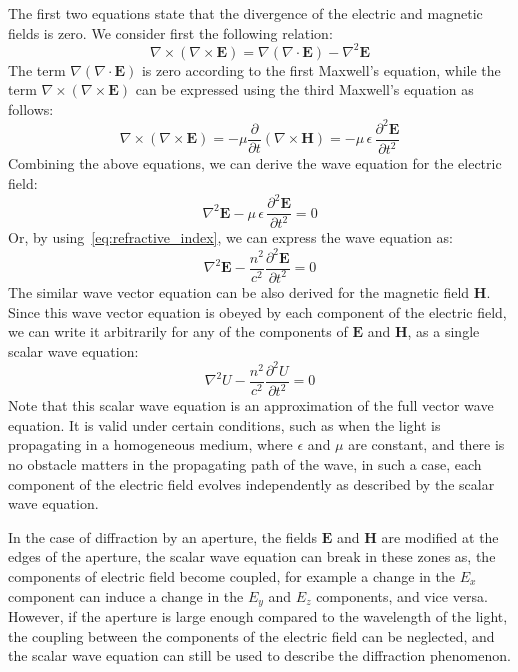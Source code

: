 \documentclass{article}
\begin{document}
The first two equations state that the divergence of the electric and magnetic fields is zero. 
We consider first the following relation:
\begin{equation}
    \nabla \times (\nabla \times \mathbf{E}) = \nabla (\nabla \cdot \mathbf{E}) - \nabla^2 \mathbf{E}
\end{equation} 
The term $\nabla (\nabla \cdot \mathbf{E})$ is zero according to the first Maxwell's equation, while the term $\nabla \times (\nabla \times \mathbf{E})$ can be expressed using the third Maxwell's equation as follows:
\begin{equation}
\nabla \times (\nabla \times \mathbf{E}) = -\mu \frac{\partial}{\partial t} (\nabla \times \mathbf{H}) = -\mu \, \epsilon \, \frac{\partial^2 \mathbf{E}}{\partial t^2}
\end{equation}
Combining the above equations, we can derive the wave equation for the electric field:
\begin{equation}
\nabla^2 \mathbf{E} - \mu \, \epsilon \, \frac{\partial^2 \mathbf{E}}{\partial t^2} = 0
\end{equation}
Or, by using~\cref{eq:refractive_index}, we can express the wave equation as:
\begin{equation}
\nabla^2 \mathbf{E} - \frac{n^2}{c^2} \frac{\partial^2 \mathbf{E}}{\partial t^2} = 0
\end{equation}
The similar wave vector equation can be also derived for the magnetic field $\mathbf{H}$.
Since this wave vector equation is obeyed by each component of the electric field, we can write it arbitrarily for any of the components of $\mathbf{E}$ and $\mathbf{H}$, as a single scalar wave equation:
\begin{equation}\label{eq:scalar_wave_equation}
\nabla^2 U - \frac{n^2}{c^2} \frac{\partial^2 U}{\partial t^2} = 0
\end{equation}
Note that this scalar wave equation is an approximation of the full vector wave equation.
It is valid under certain conditions, such as when the light is propagating in a homogeneous medium, where $\epsilon$ and $\mu$ are constant, and there is no obstacle matters in the propagating path of the wave, in such a case, each component of the electric field evolves independently as described by the scalar wave equation. 

In the case of diffraction by an aperture, the fields $\mathbf{E}$ and $\mathbf{H}$ are modified at the edges of the aperture, the scalar wave equation can break in these zones as, the components of electric field become coupled, for example a change in the $E_x$ component can induce a change in the $E_y$ and $E_z$ components, and vice versa. However, if the aperture is large enough compared to the wavelength of the light, the coupling between the components of the electric field can be neglected, and the scalar wave equation can still be used to describe the diffraction phenomenon.
\end{document}
